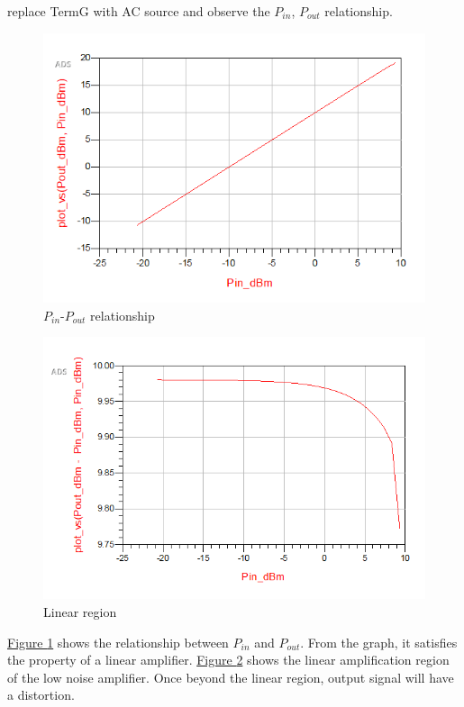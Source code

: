 \documentclass[12pt,a4paper]{report}
\begin{document}
replace TermG with AC source and observe the $P_{in}$, $P_{out}$ relationship.
\begin{figure}
    \centerline{\includegraphics[]{P_inP_out.PNG}}
    \caption{$P_{in}$-$P_{out}$ relationship}
    \label{inout}
\end{figure}
\begin{figure}
    \centerline{\includegraphics{P_inP_outSlope.PNG}}
    \caption{Linear region}
    \label{linearregion}
\end{figure}
\hyperref[inout]{Figure \ref*{inout}} shows the relationship between $P_{in}$ and $P_{out}$. From the graph, it satisfies the property of a linear amplifier. \hyperref[linearregion]{Figure \ref*{linearregion}} shows the 
linear amplification region of the low noise amplifier. Once beyond the linear region, output signal will have a distortion.
\end{document}
